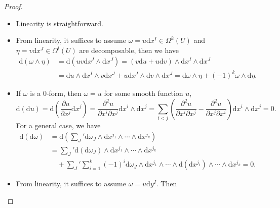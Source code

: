 \documentclass[../main.tex]{subfiles}
\begin{document}
\begin{proof}
  \begin{itemize}
    \item Linearity is straightforward.
    \item From linearity, it suffices to assume $\omega = u \mathrm{d} x^I \in \Omega^k(U)$ and $\eta = v \mathrm{d} x^J \in \Omega^l(U)$ are decomposable, then we have
      \begin{equation*}
        \begin{aligned}
          \mathrm{d} (\omega \wedge \eta) &= \mathrm{d} (uv \mathrm{d} x^I \wedge \mathrm{d} x^J) = (v \mathrm{d} u + u \mathrm{d} v) \wedge \mathrm{d} x^I \wedge \mathrm{d} x^J \\
          &= \mathrm{d} u \wedge \mathrm{d} x^I \wedge v \mathrm{d} x^J + u \mathrm{d} x^I \wedge \mathrm{d} v \wedge \mathrm{d} x^J = \mathrm{d} \omega \wedge \eta + (-1)^k \omega \wedge \mathrm{d} \eta.
        \end{aligned}
      \end{equation*}
    \item If $\omega$ is a 0-form, then $\omega = u$ for some smooth function $u$,
      \begin{equation*}
          \mathrm{d} (\mathrm{d} u) = \mathrm{d} \left(\frac{\partial u}{\partial x^j} \mathrm{d} x^j\right) = \frac{\partial ^2 u}{\partial x^i \partial x^j} \mathrm{d} x^i \wedge \mathrm{d} x^j = \sum_{i<j} \left(\frac{\partial ^2 u}{\partial x^i \partial x^j} - \frac{\partial ^2 u}{\partial x^j \partial x^i}\right) \mathrm{d} x^i \wedge \mathrm{d} x^j = 0.
      \end{equation*}
      For a general case, we have
      \begin{equation*}
        \begin{aligned}
          \mathrm{d} (\mathrm{d} \omega) &= \mathrm{d} \left(\sum_{J}^{}' \mathrm{d} \omega_J \wedge \mathrm{d} x^{j_1} \wedge \cdots \wedge \mathrm{d} x^{j_k}\right)\\
          &= \sum_{J}^{}' \mathrm{d} (\mathrm{d} \omega_J) \wedge \mathrm{d} x^{j_1} \wedge \cdots \wedge \mathrm{d} x^{j_k}\\
          & \quad + \sum_{J}^{}' \sum_{i=1}^k (-1)^i \mathrm{d} \omega_J \wedge \mathrm{d} x^{j_1} \wedge \cdots \wedge \mathrm{d} (\mathrm{d} x^{j_i}) \wedge \cdots \wedge \mathrm{d} x^{j_k} = 0.
        \end{aligned}
      \end{equation*}
    \item From linearity, it suffices to assume $\omega = u \mathrm{d} y^I$. Then

\end{itemize}
\end{proof}
\end{document}
